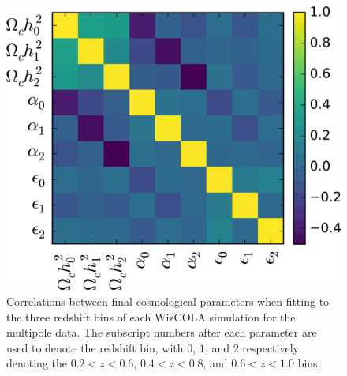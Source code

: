\documentclass[a4paper,fleqn,usenatbib]{mnras}
\begin{document}
\begin{figure}
	\begin{center}
		\includegraphics[width=0.85\columnwidth]{correlations.png}
	\end{center}
	\caption{Correlations between final cosmological parameters when fitting to the three redshift bins of each WizCOLA simulation for the multipole data. The subscript numbers after each parameter are used to denote the redshift bin, with $0$, $1$, and $2$ respectively denoting the $0.2 < z < 0.6$, $0.4 < z < 0.8$, and $0.6 < z < 1.0$ bins. }
	\label{fig:correlations}
\end{figure}
\end{document}
